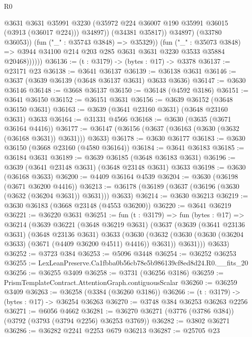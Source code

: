 \begin{lexlean}{R0}
\begin{coremodule}
                          @3631
                          @3631
                          @35991
                          @3230
                          (@35972 @224 @36007 @190 @35991 @36015 (@3913 (@36017 @224)))
                          @34897))
                      (@34381 @35817))
                    @34897)
                  (@33780 @36053))
                (fun ("_" : @35743 @3848) => @35329))
              (fun ("_" : @35073 @3848) =>
              @3944 @34100 @214 @203 @285 @3631 @3631 @3230 @3533 @35884 @20468))))))
@36136 := (t : @3179) -> (bytes : @17) -> @3378
@36137 := @23171 @23
@36138 := @3641 @36137
@36139 := @36138 @3631
@36146 := @3637 (@3639 @36139 (@3648 @36137 @3631) @3633 @3636)
@36147 := @3630 @36146
@36148 := @3668 @36137
@36150 := @36148 (@4592 @3186)
@36151 := @3641 @36150
@36152 := @36151 @3631
@36156 := @3639 @36152 (@3648 @36150 @3631)
@36163 := @3639 (@3641 @23160 @3631) (@3648 @23160 @3631) @3633
@36164 := @31331 @4566
@36168 := @3630 (@3635 (@3671 @36164 @4416))
@36177 := @36147 (@36156 (@3637 (@36163 (@3630 (@3632 (@36168 @3631)) @3631))) @3633)
@36178 := @3630 @36177
@36183 := @3630 @36150 (@3668 @23160 (@4580 @36164))
@36184 := @3641 @36183
@36185 := @36184 @3631
@36189 := @3639 @36185 (@3648 @36183 @3631)
@36196 := @3639 (@3641 @23148 @3631) (@3648 @23148 @3631) @3633
@36198 := @3630 (@36168 @3633)
@36200 := @4409 @36164 @4539
@36204 := @3630 (@36198 (@3671 @36200 @4416))
@36213 := @36178 (@36189 (@3637 (@36196 (@3630 (@3632 (@36204 @3631)) @3631))) @3633)
@36214 := @3630 @36213
@36219 := @3630 @36183 (@3668 @23148 (@4553 @36200))
@36220 := @3641 @36219
@36221 := @36220 @3631
@36251 := fun (t : @3179) =>
  fun (bytes : @17) =>
  @36214
    (@3639
      @36221
      (@3648 @36219 @3631)
      (@3637
        (@3639
          (@3641 @23136 @3631)
          (@3648 @23136 @3631)
          @3633
          (@3630
            (@3632 (@3630 (@3630 (@36204 @3633) (@3671 (@4409 @36200 @4511) @4416)) @3631))
            @3631)))
      @3633)
@36252 := @3723 @384
@36253 := @5096 @3448
@36254 := @36252 @36253
@36255 := LexLeanPreserve.Ca1fbba0b56cb78e5b986139cf8ed8d24.R0.__fits_20
@36256 := @36255 @3409
@36258 := @3731 (@36256 @3186)
@36259 := PrismTemplateContract.AttentionGraph.contiguousScalar
@36260 := @36259 @3409
@36263 := @36258 (@3384 (@36260 @3186))
@36266 := (t : @3179) -> (bytes : @17) -> @36254 @36263
@36270 := @3748 @384 @36253 @36263 @2256
@36271 := @6056 @4662
@36281 := @36270 @36271 (@3776 (@3786 @384)) (@3792 (@3793 (@3794 @2256) @36253 @3769))
@36282 := @3802 @36271
@36286 := @36282 @2241 @2253 @679 @36213
@36287 := @25705 @23

\end{coremodule}
\end{lexlean}
